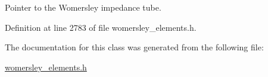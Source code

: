 Pointer to the Womersley impedance tube. 



Definition at line 2783 of file womersley\+\_\+elements.\+h.



The documentation for this class was generated from the following file\+:\begin{DoxyCompactItemize}
\item 
\hyperlink{womersley__elements_8h}{womersley\+\_\+elements.\+h}\end{DoxyCompactItemize}
